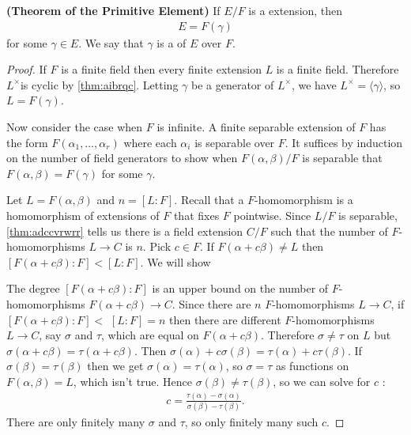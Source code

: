 \documentclass{article}
\newcommand{\bfs}[1]{\textbf{({#1}) }}
\begin{document}
\begin{thma}\bfs{Theorem of the Primitive Element}\label{thm:d9qdadc}
If $E / F$ is a  extension, then
\begin{align*}
E=F(\gamma)
\end{align*}
for some $\gamma \in E$. We say that $\gamma$ is a  of $E$ over $F$.
\end{thma}
\begin{proof}
If $F$ is a finite field then every finite extension $L$ is a finite field. Therefore $L^{\times}$is cyclic by \cref{thm:aibrqc}. Letting $\gamma$ be a generator of $L^{\times}$, we have $L^{\times}=\langle\gamma\rangle$, so $L=F(\gamma)$.

Now consider the case when $F$ is infinite. A finite separable extension of $F$ has the form $F\left(\alpha_{1}, \ldots, \alpha_{r}\right)$ where each $\alpha_{i}$ is separable over $F$. It suffices by induction on the number of field generators to show when $F(\alpha, \beta) / F$ is separable that $F(\alpha, \beta)=F(\gamma)$ for some $\gamma$.

Let $L=F(\alpha, \beta)$ and $n=[L: F]$. Recall that a $F$-homomorphism is a homomorphism of extensions of $F$ that fixes $F$ pointwise. Since $L / F$ is separable, \cref{thm:adccvrwrr} tells us there is a field extension $C / F$ such that the number of $F$-homomorphisms $L \rightarrow C$ is $n$. Pick $c \in F$. If $F(\alpha+c \beta) \neq L$ then $[F(\alpha+c \beta): F]<[L: F]$. We will show 

The degree $[F(\alpha+c \beta): F]$ is an upper bound on the number of $F$-homomorphisms $F(\alpha+c \beta) \rightarrow C$. Since there are $n$ $F$-homomorphisms $L \rightarrow C$, if $[F(\alpha+c \beta): F]<$ $[L: F]=n$ then there are different $F$-homomorphisms $L \rightarrow C$, say $\sigma$ and $\tau$, which are equal on $F(\alpha+c \beta)$. Therefore $\sigma \neq \tau$ on $L$ but $\sigma(\alpha+c \beta)=\tau(\alpha+c \beta)$. Then
$\sigma(\alpha)+c \sigma(\beta)=\tau(\alpha)+c \tau(\beta)$. If $\sigma(\beta)=\tau(\beta)$ then we get $\sigma(\alpha)=\tau(\alpha)$, so $\sigma=\tau$ as functions on $F(\alpha, \beta)=L$, which isn't true. Hence $\sigma(\beta) \neq \tau(\beta)$, so we can solve for $c$ :
\begin{align*}
c=\frac{\tau(\alpha)-\sigma(\alpha)}{\sigma(\beta)-\tau(\beta)} .
\end{align*}
There are only finitely many $\sigma$ and $\tau$, so only finitely many such $c$.
\end{proof}
\end{document}
